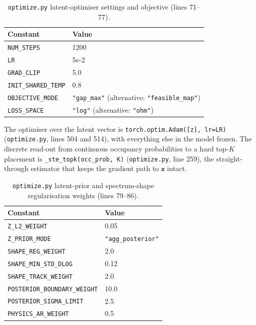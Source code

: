 \begin{table}[htbp]
\centering
\caption{\texttt{optimize.py} latent-optimiser settings and objective (lines 71--77).}
\label{tab:appb_opt_optimizer}
\begin{tabular}{@{}lp{}@{}}
\hline
Constant & Value \\
\hline
\texttt{NUM\_STEPS} & 1200 \\
\texttt{LR} & 5e-2 \\
\texttt{GRAD\_CLIP} & 5.0 \\
\texttt{INIT\_SHARED\_TEMP} & 0.8 \\
\texttt{OBJECTIVE\_MODE} & \texttt{"gap\_max"} (alternative: \texttt{"feasible\_map"}) \\
\texttt{LOSS\_SPACE} & \texttt{"log"} (alternative: \texttt{"ohm"}) \\
\hline
\end{tabular}
\end{table}

The optimiser over the latent vector is \texttt{torch.optim.Adam([z], lr=LR)}
(\texttt{optimize.py}, lines 504 and 514), with everything else in the model frozen. The
discrete read-out from continuous occupancy probabilities to a hard top-$K$ placement is
\texttt{\_ste\_topk(occ\_prob, K)} (\texttt{optimize.py}, line 259), the straight-through
estimator that keeps the gradient path to $\mathbf{z}$ intact.

\begin{table}[htbp]
\centering
\caption{\texttt{optimize.py} latent-prior and spectrum-shape regularisation weights
(lines 79--86).}
\label{tab:appb_opt_prior}
\begin{tabular}{@{}ll@{}}
\hline
Constant & Value \\
\hline
\texttt{Z\_L2\_WEIGHT} & 0.05 \\
\texttt{Z\_PRIOR\_MODE} & \texttt{"agg\_posterior"} \\
\texttt{SHAPE\_REG\_WEIGHT} & 2.0 \\
\texttt{SHAPE\_MIN\_STD\_DLOG} & 0.12 \\
\texttt{SHAPE\_TRACK\_WEIGHT} & 2.0 \\
\texttt{POSTERIOR\_BOUNDARY\_WEIGHT} & 10.0 \\
\texttt{POSTERIOR\_SIGMA\_LIMIT} & 2.5 \\
\texttt{PHYSICS\_AR\_WEIGHT} & 0.5 \\
\hline
\end{tabular}
\end{table}

